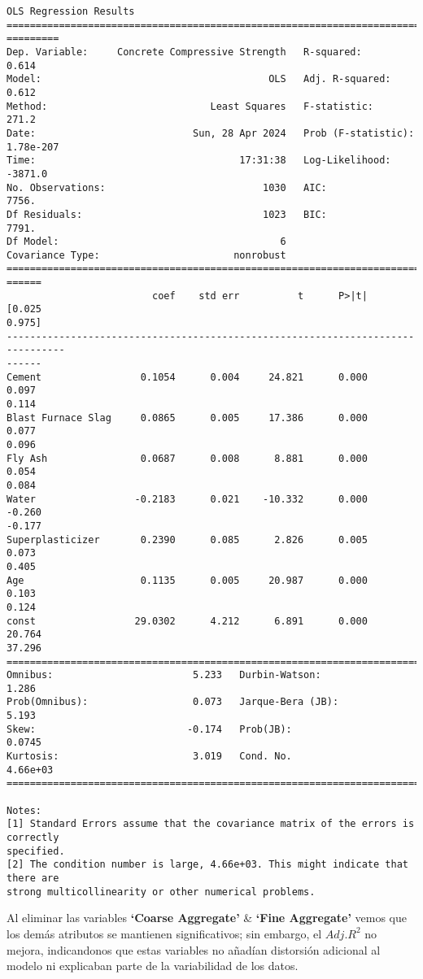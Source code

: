 \documentclass[11pt]{article}
\begin{document}
    \begin{Verbatim}[commandchars=\\\{\}]
                                  OLS Regression Results
================================================================================
=========
Dep. Variable:     Concrete Compressive Strength   R-squared:
0.614
Model:                                       OLS   Adj. R-squared:
0.612
Method:                            Least Squares   F-statistic:
271.2
Date:                           Sun, 28 Apr 2024   Prob (F-statistic):
1.78e-207
Time:                                   17:31:38   Log-Likelihood:
-3871.0
No. Observations:                           1030   AIC:
7756.
Df Residuals:                               1023   BIC:
7791.
Df Model:                                      6
Covariance Type:                       nonrobust
================================================================================
======
                         coef    std err          t      P>|t|      [0.025
0.975]
--------------------------------------------------------------------------------
------
Cement                 0.1054      0.004     24.821      0.000       0.097
0.114
Blast Furnace Slag     0.0865      0.005     17.386      0.000       0.077
0.096
Fly Ash                0.0687      0.008      8.881      0.000       0.054
0.084
Water                 -0.2183      0.021    -10.332      0.000      -0.260
-0.177
Superplasticizer       0.2390      0.085      2.826      0.005       0.073
0.405
Age                    0.1135      0.005     20.987      0.000       0.103
0.124
const                 29.0302      4.212      6.891      0.000      20.764
37.296
==============================================================================
Omnibus:                        5.233   Durbin-Watson:                   1.286
Prob(Omnibus):                  0.073   Jarque-Bera (JB):                5.193
Skew:                          -0.174   Prob(JB):                       0.0745
Kurtosis:                       3.019   Cond. No.                     4.66e+03
==============================================================================

Notes:
[1] Standard Errors assume that the covariance matrix of the errors is correctly
specified.
[2] The condition number is large, 4.66e+03. This might indicate that there are
strong multicollinearity or other numerical problems.
    \end{Verbatim}

    Al eliminar las variables \textbf{`Coarse Aggregate'} \& \textbf{`Fine
Aggregate'} vemos que los demás atributos se mantienen significativos;
sin embargo, el \(Adj. R^2\) no mejora, indicandonos que estas variables
no añadían distorsión adicional al modelo ni explicaban parte de la
variabilidad de los datos.
\end{document}
